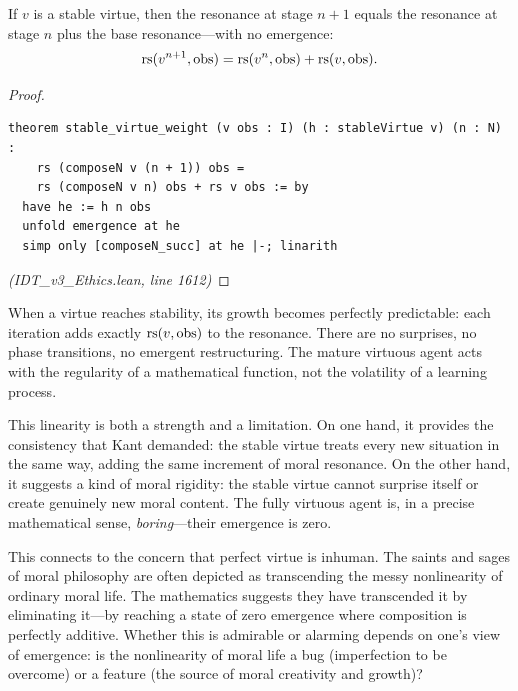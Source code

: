 \begin{theorem}
\label{thm:stable-virtue-linear}
If $v$ is a stable virtue, then the resonance at stage $n+1$ equals the
resonance at stage $n$ plus the base resonance---with no emergence:
\[
  \mathrm{rs}(v^{n+1}, \mathrm{obs}) = \mathrm{rs}(v^n, \mathrm{obs}) + \mathrm{rs}(v, \mathrm{obs}).
\]
\end{theorem}

\begin{proof}
\begin{lstlisting}
theorem stable_virtue_weight (v obs : I) (h : stableVirtue v) (n : N) :
    rs (composeN v (n + 1)) obs =
    rs (composeN v n) obs + rs v obs := by
  have he := h n obs
  unfold emergence at he
  simp only [composeN_succ] at he |-; linarith
\end{lstlisting}
\textit{(IDT\_v3\_Ethics.lean, line 1612)}
\end{proof}

\begin{interpretation}
When a virtue reaches stability, its growth becomes perfectly predictable:
each iteration adds exactly $\mathrm{rs}(v, \mathrm{obs})$ to the resonance. There
are no surprises, no phase transitions, no emergent restructuring. The mature
virtuous agent acts with the regularity of a mathematical function, not the
volatility of a learning process.

This linearity is both a strength and a limitation. On one hand, it provides
the consistency that Kant demanded: the stable virtue treats every new
situation in the same way, adding the same increment of moral resonance.
On the other hand, it suggests a kind of moral rigidity: the stable virtue
cannot surprise itself or create genuinely new moral content. The fully
virtuous agent is, in a precise mathematical sense, \emph{boring}---their
emergence is zero.

This connects to the concern that perfect virtue is inhuman. The saints and
sages of moral philosophy are often depicted as transcending the messy
nonlinearity of ordinary moral life. The mathematics suggests they have
transcended it by eliminating it---by reaching a state of zero emergence
where composition is perfectly additive. Whether this is admirable or
alarming depends on one's view of emergence: is the nonlinearity of
moral life a bug (imperfection to be overcome) or a feature (the source
of moral creativity and growth)?
\end{interpretation}

